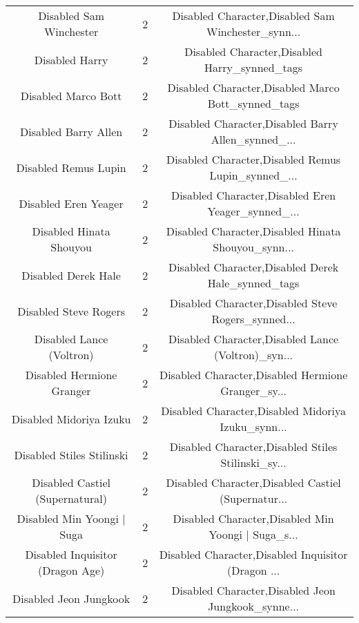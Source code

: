 \begin{table}[h!]
{\begin{tabular}{|c|c|c|}
                           Disabled Sam Winchester &          2 & Disabled Character,Disabled Sam Winchester\_synn... \\
                                    Disabled Harry &          2 &      Disabled Character,Disabled Harry\_synned\_tags \\
                               Disabled Marco Bott &          2 & Disabled Character,Disabled Marco Bott\_synned\_tags \\
                              Disabled Barry Allen &          2 & Disabled Character,Disabled Barry Allen\_synned\_... \\
                              Disabled Remus Lupin &          2 & Disabled Character,Disabled Remus Lupin\_synned\_... \\
                              Disabled Eren Yeager &          2 & Disabled Character,Disabled Eren Yeager\_synned\_... \\
                           Disabled Hinata Shouyou &          2 & Disabled Character,Disabled Hinata Shouyou\_synn... \\
                               Disabled Derek Hale &          2 & Disabled Character,Disabled Derek Hale\_synned\_tags \\
                             Disabled Steve Rogers &          2 & Disabled Character,Disabled Steve Rogers\_synned... \\
                          Disabled Lance (Voltron) &          2 & Disabled Character,Disabled Lance (Voltron)\_syn... \\
                         Disabled Hermione Granger &          2 & Disabled Character,Disabled Hermione Granger\_sy... \\
                           Disabled Midoriya Izuku &          2 & Disabled Character,Disabled Midoriya Izuku\_synn... \\
                         Disabled Stiles Stilinski &          2 & Disabled Character,Disabled Stiles Stilinski\_sy... \\
                   Disabled Castiel (Supernatural) &          2 & Disabled Character,Disabled Castiel (Supernatur... \\
                        Disabled Min Yoongi | Suga &          2 & Disabled Character,Disabled Min Yoongi | Suga\_s... \\
                  Disabled Inquisitor (Dragon Age) &          2 & Disabled Character,Disabled Inquisitor (Dragon ... \\
                            Disabled Jeon Jungkook &          2 & Disabled Character,Disabled Jeon Jungkook\_synne... \\

\end{tabular}}
\end{table}
